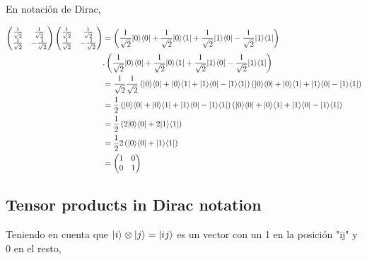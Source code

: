 \documentclass[osajnl,preprint,showpacs,superscriptaddress,10pt]{revtex4-1} %
\DeclarePairedDelimiter\bra{\langle}{\rvert}
\DeclarePairedDelimiter\ket{\lvert}{\rangle}
\begin{document}
\begin{itemize}
    En notación de Dirac,
    \begin{fleqn}[\parindent]
    \begin{equation}
    \begin{split}
        \begin{pmatrix}\frac{1}{\sqrt{2}} & \frac{1}{\sqrt{2}} \\ \frac{1}{\sqrt{2}} & -\frac{1}{\sqrt{2}}\end{pmatrix}\begin{pmatrix}\frac{1}{\sqrt{2}} & \frac{1}{\sqrt{2}} \\ \frac{1}{\sqrt{2}} & -\frac{1}{\sqrt{2}}\end{pmatrix}
            &= \left (\frac{1}{\sqrt{2}}\ket{0}\bra{0} + \frac{1}{\sqrt{2}}\ket{0}\bra{1} + \frac{1}{\sqrt{2}}\ket{1}\bra{0} -\frac{1}{\sqrt{2}}\ket{1}\bra{1} \right) \\
            &. \left (\frac{1}{\sqrt{2}}\ket{0}\bra{0} + \frac{1}{\sqrt{2}}\ket{0}\bra{1} + \frac{1}{\sqrt{2}}\ket{1}\bra{0} -\frac{1}{\sqrt{2}}\ket{1}\bra{1} \right) \\
            &= \frac{1}{\sqrt{2}}\frac{1}{\sqrt{2}} \left (\ket{0}\bra{0} + \ket{0}\bra{1} + \ket{1}\bra{0} -\ket{1}\bra{1} \right) \left (\ket{0}\bra{0} + \ket{0}\bra{1} + \ket{1}\bra{0} -\ket{1}\bra{1} \right) \\
            &= \frac{1}{2} \left (\ket{0}\bra{0} + \ket{0}\bra{1} + \ket{1}\bra{0} -\ket{1}\bra{1} \right) \left (\ket{0}\bra{0} + \ket{0}\bra{1} + \ket{1}\bra{0} -\ket{1}\bra{1} \right) \\
            &= \frac{1}{2} \left (2\ket{0}\bra{0} + 2\ket{1}\bra{1} \right) \\
            &= \frac{1}{2} 2 \left (\ket{0}\bra{0} + \ket{1}\bra{1} \right) \\
            &= \begin{pmatrix}1 & 0\\ 0 & 1\end{pmatrix}
    \end{split}
    \end{equation}
    \end{fleqn}
\end{itemize}

\subsection{Tensor products in Dirac notation}

Teniendo en cuenta que $\ket{i} \tens \ket{j} = \ket{i j}$ es un vector con un 1 en la posición "ij" y 0 en el resto, \\
\end{document}
